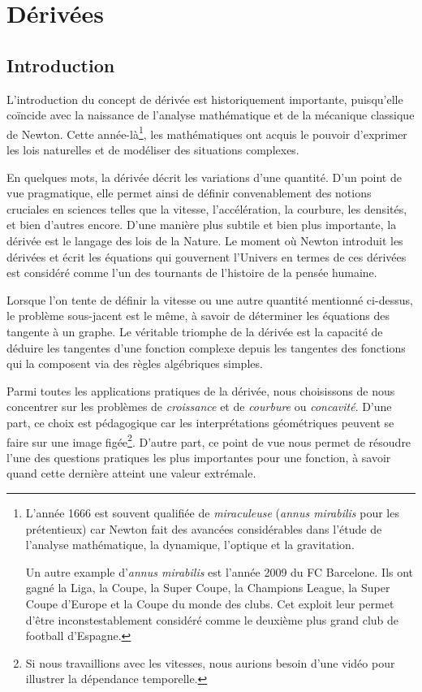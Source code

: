 \documentclass[main.tex]{subfiles}
\begin{document}
\chapter{Dérivées}

\section{Introduction}

L'introduction du concept de dérivée est historiquement importante,
puisqu'elle coïncide avec la naissance de l'analyse mathématique et de la mécanique classique de Newton.
Cette année-là\footnote{%
    L'année 1666 est souvent qualifiée de \emph{miraculeuse} (\emph{annus mirabilis} pour les prétentieux)
    car Newton fait des avancées considérables dans l'étude de
    l'analyse mathématique, la dynamique, l'optique et la gravitation.

    Un autre example d'\emph{annus mirabilis} est l'année 2009 du FC Barcelone.
    Ils ont gagné la Liga, la Coupe, la Super Coupe, la Champions League, la Super Coupe d'Europe et la Coupe du monde des clubs.
    Cet exploit leur permet d'être inconstestablement considéré comme le deuxième plus grand club de football d'Espagne.
},
les mathématiques ont acquis le pouvoir d'exprimer les lois naturelles et de modéliser des situations complexes.

En quelques mots,
la dérivée décrit les variations d'une quantité.
D'un point de vue pragmatique,
elle permet ainsi de définir convenablement des notions cruciales en sciences
telles que la vitesse, l'accélération, la courbure, les densités, et bien d'autres encore.
D'une manière plus subtile et bien plus importante,
la dérivée est le langage des lois de la Nature.
Le moment où Newton introduit les dérivées
et écrit les équations qui gouvernent l'Univers en termes de ces dérivées
est considéré comme l'un des tournants de l'histoire de la pensée humaine.

Lorsque l'on tente de définir la vitesse ou une autre quantité mentionné ci-dessus,
le problème sous-jacent est le même,
à savoir de déterminer les équations des tangente à un graphe.
Le véritable triomphe de la dérivée
est la capacité de déduire les tangentes d'une fonction complexe
depuis les tangentes des fonctions qui la composent
via des règles algébriques simples.

Parmi toutes les applications pratiques de la dérivée,
nous choisissons de nous concentrer sur les problèmes de \emph{croissance} et de \emph{courbure} ou \emph{concavité}.
D'une part,
ce choix est pédagogique car les interprétations géométriques peuvent se faire sur une image figée\footnote{%
    Si nous travaillions avec les vitesses,
    nous aurions besoin d'une vidéo pour illustrer la dépendance temporelle.
}.
D'autre part,
ce point de vue nous permet de résoudre l'une des questions pratiques les plus importantes pour une fonction,
à savoir quand cette dernière atteint une valeur extrémale.
\end{document}
